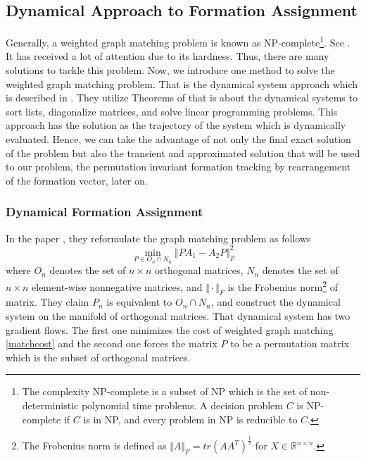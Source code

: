 \documentclass[11pt, a4paper, oneside, openany, reqno]{book}
\theoremstyle{definition}
\theoremstyle{remark}
\numberwithin{equation}{chapter} %
\newcommand{\R}{\ensuremath{{\mathbb R}}}
\begin{document}
\subsection{Dynamical Approach to Formation Assignment}
Generally, a weighted graph matching problem is known as NP-complete\footnote
{The complexity NP-complete is a subset of NP 
which is the set of non-deterministic polynomial time problems.
A decision problem $ C $ is NP-complete if $ C $ is in NP, and every problem in NP is reducible to $ C $.}. 
See \cite{npc1, npc2}.
It has received a lot of attention due to its hardness. Thus, there are many solutions to tackle
this problem. Now, we introduce one method to solve the weighted graph matching problem.
That is the dynamical system approach which is described in \cite{graphmatch}.
They utilize Theorems of \cite{broc} that is 
about the dynamical systems to sort lists, diagonalize matrices, 
and solve linear programming problems.
This approach has the solution as the trajectory of the system which is dynamically evaluated.
Hence, we can take the advantage of not only the final exact solution of the problem
but also the transient and approximated solution 
that will be used to our problem, the permutation invariant formation tracking 
by rearrangement of the formation vector, later on.

\subsubsection{Dynamical Formation Assignment}
In the paper \cite{graphmatch}, they reformulate the graph matching problem as follows
\begin{equation}\label{matchcost}
	\min_{P \in O_n \cap N_n}  \Vert PA_1 - A_2 P \Vert_F^2	
\end{equation} 
where $ O_n $ denotes the set of $ n \times n $ orthogonal matrices,
$ N_n $ denotes the set of $ n \times n $ element-wise nonnegative matrices, 
and $ \Vert \cdot \Vert_F $ is the Frobenius norm\footnote
{The Frobenius norm is defined as
 $ \Vert A \Vert_F = tr(A A^T)^{\frac{1}{2}}$ for $ X \in \R^{n \times n} $.}
of matrix. 
They claim $ P_n $ is equivalent to $ O_n \cap N_n $, and
construct the dynamical system on the manifold of orthogonal matrices.
That dynamical system has two gradient flows. 
The first one minimizes the cost of weighted graph matching \eqref{matchcost}
and the second one forces the matrix $ P $ to be a permutation matrix
which is the subset of orthogonal matrices.
\end{document}
